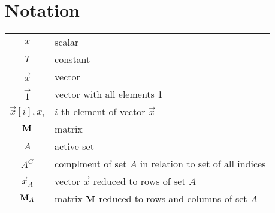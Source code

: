 \section*{Notation}
\begin{tabular}{c l}
$x$ & scalar\\
$T$ & constant\\
$\vec{x}$ & vector\\
$\vec{1}$ & vector with all elements 1\\
$\vec{x}[i],x_i$ & $i$-th element of vector $\vec{x}$\\
$\boldsymbol{\mathrm{M}}$ & matrix\\
$A$ & active set\\
$A^C$ & complment of set $A$ in relation to set of all indices\\ 
$\vec{x}_A$ & vector $\vec{x}$ reduced to rows of set $A$ \\
$\boldsymbol{\mathrm{M}}_A$ & matrix $\boldsymbol{\mathrm{M}}$ reduced to rows and columns of set $A$ \\

\end{tabular}



